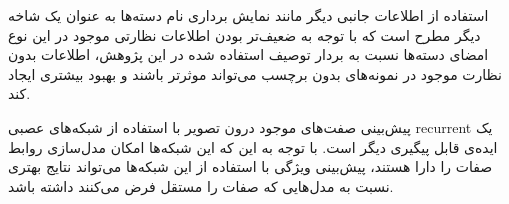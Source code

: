 استفاده از اطلاعات جانبی دیگر مانند نمایش برداری نام دسته‌ها به عنوان یک شاخه دیگر مطرح است که با توجه به ضعیف‌تر بودن اطلاعات نظارتی موجود در این نوع امضای  دسته‌ها نسبت به بردار توصیف استفاده شده در این پژوهش، اطلاعات بدون نظارت موجود در نمونه‌های بدون برچسب  می‌تواند موثرتر باشند و بهبود بیشتری ایجاد کند.

پیش‌بینی صفت‌های موجود درون تصویر با استفاده از شبکه‌های عصبی \gls{recurrent} یک ایده‌ی قابل پیگیری دیگر است. با توجه به این که این شبکه‌ها امکان مدل‌سازی روابط صفات را دارا هستند، پیش‌بینی ویژگی با استفاده از این شبکه‌ها می‌تواند نتایج بهتری نسبت به مدل‌هایی که صفات را مستقل فرض می‌کنند داشته باشد. 
